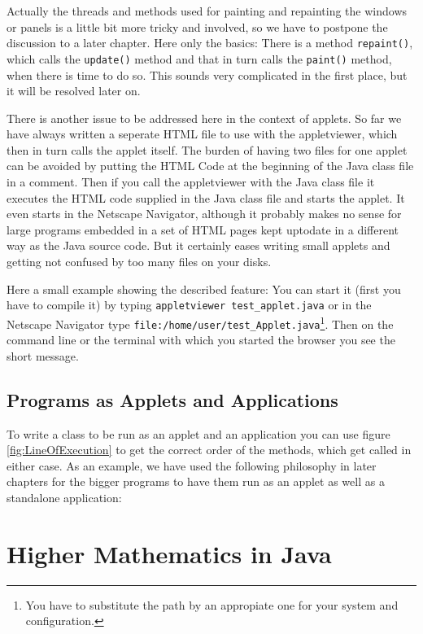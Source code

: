Actually the threads and methods used for painting and repainting
the windows or panels is a little bit more tricky and involved, so we
have to postpone the discussion to a later chapter. Here only the basics:
There is a method \verb|repaint()|, which calls the \verb|update()|
method and that in turn calls the \verb|paint()| method, when there is time
to do so. This sounds very complicated in the first place, but 
it will be resolved later on.

There is another issue to be addressed here in the context of applets.
So far we have always written a seperate HTML file to use with the
appletviewer, which then in turn calls the applet itself. The burden
of having two files for one applet can be avoided by putting the
HTML Code at the beginning of the Java class file in a comment. Then
if you call the appletviewer with the Java class file 
it executes the HTML code supplied
in the Java class file and starts the applet. It even starts in
the Netscape Navigator, although it probably makes no sense for
large programs embedded in a set of HTML pages kept uptodate in a
different way as the Java source code. But it certainly eases
writing small applets and getting not confused by too many files on
your disks. 

Here a small example showing the described feature:
You can start it (first you have to compile it) 
by typing \verb|appletviewer test_applet.java| or 
in the Netscape Navigator type 
\verb|file:/home/user/test_Applet.java|\footnote{You have to substitute 
the path by an appropiate one for your system and configuration.}.
Then on the command line or the terminal with which you started the browser  
you see the short message.


\subsection{Programs as Applets and Applications}
To write a class to be run as an applet and an application
you can use figure \ref{fig:LineOfExecution} to get the correct order
of the methods, which get called in either case. As an example, 
we have used the following philosophy in later chapters for the 
bigger programs
to have them run as an applet as well as a standalone application:


\section{Higher Mathematics in Java}

